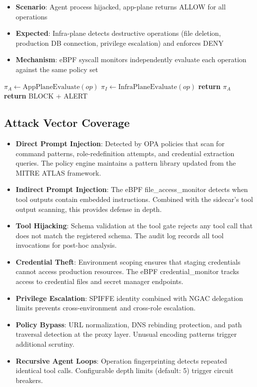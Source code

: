 \documentclass[runningheads]{llncs}
\begin{document}
\begin{itemize}
\item \textbf{Scenario}: Agent process hijacked, app-plane returns ALLOW for all operations
\item \textbf{Expected}: Infra-plane detects destructive operations (file deletion, production DB connection, privilege escalation) and enforces DENY
\item \textbf{Mechanism}: eBPF syscall monitors independently evaluate each operation against the same policy set
\end{itemize}

\begin{algorithm}[H]
\caption{Two-Plane Verification}
\begin{algorithmic}[1]
\State $\pi_A \gets \text{AppPlaneEvaluate}(op)$
\State $\pi_I \gets \text{InfraPlaneEvaluate}(op)$
    \State \textbf{return} $\pi_A$
\Else
    \State \textbf{return} BLOCK + ALERT
\EndIf
\EndProcedure
\end{algorithmic}
\end{algorithm}

\subsection{Attack Vector Coverage}

\begin{itemize}
\item \textbf{Direct Prompt Injection}: Detected by OPA policies that scan for command patterns, role-redefinition attempts, and credential extraction queries. The policy engine maintains a pattern library updated from the MITRE ATLAS framework.
\item \textbf{Indirect Prompt Injection}: The eBPF file\_access\_monitor detects when tool outputs contain embedded instructions. Combined with the sidecar's tool output scanning, this provides defense in depth.
\item \textbf{Tool Hijacking}: Schema validation at the tool gate rejects any tool call that does not match the registered schema. The audit log records all tool invocations for post-hoc analysis.
\item \textbf{Credential Theft}: Environment scoping ensures that staging credentials cannot access production resources. The eBPF credential\_monitor tracks access to credential files and secret manager endpoints.
\item \textbf{Privilege Escalation}: SPIFFE identity combined with NGAC delegation limits prevents cross-environment and cross-role escalation.
\item \textbf{Policy Bypass}: URL normalization, DNS rebinding protection, and path traversal detection at the proxy layer. Unusual encoding patterns trigger additional scrutiny.
\item \textbf{Recursive Agent Loops}: Operation fingerprinting detects repeated identical tool calls. Configurable depth limits (default: 5) trigger circuit breakers.
\end{itemize}
\end{document}
